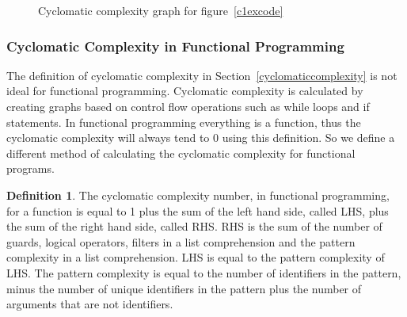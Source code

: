\documentclass[12pt]{article}
\theoremstyle{definition}
\newtheorem*{definition}{Definition}
\theoremstyle{theorem}
\begin{document}
\begin{figure}[H]
    \centering
    \caption{Cyclomatic complexity graph for figure~\ref{c1excode}}\label{fig:c1exgraph}
\end{figure}

\subsubsection{Cyclomatic Complexity in Functional Programming}

The definition of cyclomatic complexity in Section~\ref{cyclomaticcomplexity} is
not ideal for functional programming. Cyclomatic complexity is calculated by
creating graphs based on control flow operations such as while loops and if
statements. In functional programming everything is a function, thus the
cyclomatic complexity will always tend to 0 using this definition. So we define a
different method of calculating the cyclomatic complexity for functional
programs. 

\theoremstyle{definition}
\begin{definition}
    The cyclomatic complexity number, in functional programming, for a function
    is equal to 1 plus the sum of the left hand side, called LHS, plus the sum
    of the right hand side, called RHS. RHS is the sum of the number of guards,
    logical operators, filters in a list comprehension and the pattern
    complexity in a list comprehension. LHS is equal to the pattern complexity
    of LHS. The pattern complexity is equal to the number of identifiers in the
    pattern, minus the number of unique identifiers in the pattern plus the
    number of arguments that are not identifiers. 
\end{definition}
\end{document}
